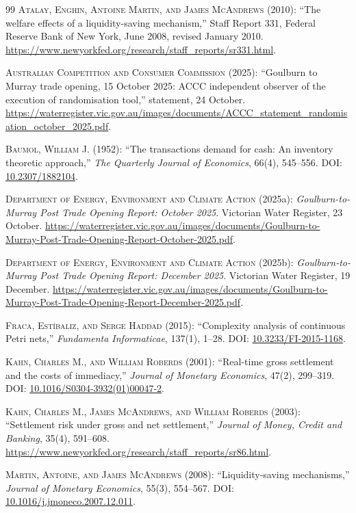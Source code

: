\documentclass[ecta,draft,supplement]{econsocart}
\theoremstyle{definition}
\theoremstyle{definition}
\begin{document}
\begin{thebibliography}{99}
\textsc{Atalay, Enghin, Antoine Martin, and James McAndrews} (2010):
``The welfare effects of a liquidity-saving mechanism,'' Staff Report 331,
Federal Reserve Bank of New York, June 2008, revised January 2010.
\url{https://www.newyorkfed.org/research/staff_reports/sr331.html}.


\textsc{Australian Competition and Consumer Commission} (2025):
``Goulburn to Murray trade opening, 15 October 2025: ACCC independent observer
of the execution of randomisation tool,'' statement, 24 October.
\url{https://waterregister.vic.gov.au/images/documents/ACCC_statement_randomisation_october_2025.pdf}.

\textsc{Baumol, William J.} (1952): ``The transactions demand for cash: An inventory theoretic approach,'' \emph{The Quarterly Journal of Economics}, 66(4), 545--556. DOI: \url{10.2307/1882104}.

\textsc{Department of Energy, Environment and Climate Action} (2025a):
\emph{Goulburn-to-Murray Post Trade Opening Report: October 2025}.
Victorian Water Register, 23 October.
\url{https://waterregister.vic.gov.au/images/documents/Goulburn-to-Murray-Post-Trade-Opening-Report-October-2025.pdf}.

\textsc{Department of Energy, Environment and Climate Action} (2025b):
\emph{Goulburn-to-Murray Post Trade Opening Report: December 2025}.
Victorian Water Register, 19 December.
\url{https://waterregister.vic.gov.au/images/documents/Goulburn-to-Murray-Post-Trade-Opening-Report-December-2025.pdf}.

\textsc{Fraca, Estíbaliz, and Serge Haddad} (2015): ``Complexity analysis of continuous Petri nets,'' \emph{Fundamenta Informaticae}, 137(1), 1--28. DOI: \url{10.3233/FI-2015-1168}.

\textsc{Kahn, Charles M., and William Roberds} (2001): ``Real-time gross settlement and the costs of immediacy,'' \emph{Journal of Monetary Economics}, 47(2), 299--319. DOI: \url{10.1016/S0304-3932(01)00047-2}.

\textsc{Kahn, Charles M., James McAndrews, and William Roberds} (2003): ``Settlement risk under gross and net settlement,'' \emph{Journal of Money, Credit and Banking}, 35(4), 591--608.
\url{https://www.newyorkfed.org/research/staff_reports/sr86.html}.

\textsc{Martin, Antoine, and James McAndrews} (2008): ``Liquidity-saving mechanisms,'' \emph{Journal of Monetary Economics}, 55(3), 554--567. DOI: \url{10.1016/j.jmoneco.2007.12.011}.

\end{thebibliography}
\end{document}

